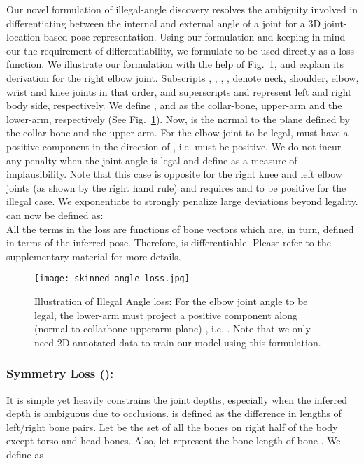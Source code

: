 \documentclass[runningheads]{llncs}
\begin{document}
Our novel formulation of illegal-angle discovery resolves the ambiguity involved in differentiating between the internal and external angle of a joint for a 3D joint-location based pose representation. Using our formulation and keeping in mind our the requirement of differentiability, we formulate  to be used directly as a loss function.  We illustrate our formulation with the help of Fig.~\ref{fig:angLoss}, and explain its derivation for the right elbow joint. Subscripts , , , ,  denote neck, shoulder, elbow, wrist and knee joints in that order, and superscripts  and  represent left and right body side, respectively. 
We define ,  and  as the collar-bone, upper-arm and the lower-arm, respectively (See Fig.~\ref{fig:angLoss}). Now,  is the normal to the plane defined by the collar-bone and the upper-arm. For the elbow joint to be legal,  must have a positive component in the direction of , i.e.  must be positive. We do not incur any penalty when the joint angle is legal and define  as a measure of implausibility. Note that this case is opposite for the right knee and left elbow joints (as shown by the right hand rule) and requires  and  to be positive for the illegal case. We exponentiate  to strongly penalize large deviations beyond legality.  can now be defined as: \\ 



All the terms in the loss are functions of bone vectors which are, in turn, defined in terms of the inferred pose. Therefore,  is differentiable. Please refer to the supplementary material for more details. 

\begin{figure}[!tb] 
	\centering
	\texttt{[image: skinned\_angle\_loss.jpg]}
    \caption{Illustration of Illegal Angle loss: For the elbow joint angle to be legal, the lower-arm must project a positive component along  (normal to collarbone-upperarm plane) , i.e. . Note that we only need 2D annotated data to train our model using this formulation.}
    \vspace{-1em}
    \label{fig:angLoss}
\end{figure}

\vspace{-1em}
\subsubsection{Symmetry Loss ():} It is simple yet heavily constrains the joint depths, especially when the inferred depth is ambiguous due to occlusions.  is defined as the difference in lengths of left/right bone pairs. Let  be the set of all the bones on right half of the body except torso and head bones. Also, let  represent the bone-length of bone . We define  as\\
 
\end{document}
